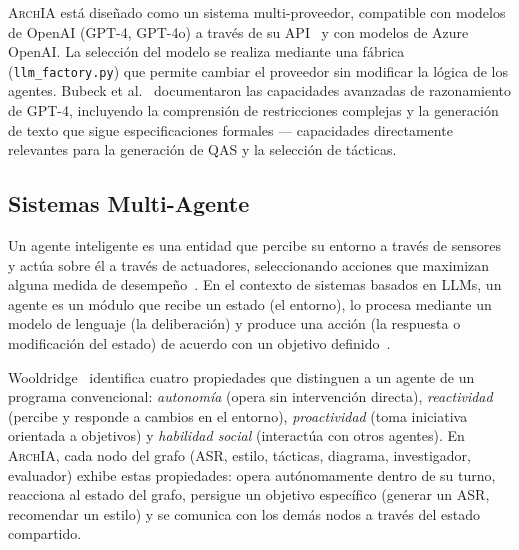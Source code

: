 \documentclass[12pt, letterpaper, oneside]{article}
\newcommand{\archia}{\textsc{ArchIA}}
\begin{document}
\archia{} está diseñado como un sistema multi-proveedor, compatible con modelos
de OpenAI (GPT-4, GPT-4o) a través de su API~\cite{openai2024} y con modelos de
Azure OpenAI. La selección del modelo se realiza mediante una fábrica
(\texttt{llm\_factory.py}) que permite cambiar el proveedor sin modificar la
lógica de los agentes. Bubeck et al.~\cite{bubeck2023sparks} documentaron las
capacidades avanzadas de razonamiento de GPT-4, incluyendo la comprensión de
restricciones complejas y la generación de texto que sigue especificaciones
formales --- capacidades directamente relevantes para la generación de QAS y la
selección de tácticas.


\subsection{Sistemas Multi-Agente}
\label{subsec:multi-agente}


Un agente inteligente es una entidad que percibe su entorno a través de sensores
y actúa sobre él a través de actuadores, seleccionando acciones que maximizan
alguna medida de desempeño~\cite{russell2020artificial}. En el contexto de
sistemas basados en LLMs, un agente es un módulo que recibe un estado (el entorno),
lo procesa mediante un modelo de lenguaje (la deliberación) y produce una acción
(la respuesta o modificación del estado) de acuerdo con un objetivo
definido~\cite{wang2023survey}.

Wooldridge~\cite{wooldridge2009introduction} identifica cuatro propiedades que
distinguen a un agente de un programa convencional: \emph{autonomía} (opera sin
intervención directa), \emph{reactividad} (percibe y responde a cambios en el
entorno), \emph{proactividad} (toma iniciativa orientada a objetivos) y
\emph{habilidad social} (interactúa con otros agentes). En \archia{}, cada nodo
del grafo (ASR, estilo, tácticas, diagrama, investigador, evaluador) exhibe estas
propiedades: opera autónomamente dentro de su turno, reacciona al estado del grafo,
persigue un objetivo específico (generar un ASR, recomendar un estilo) y se
comunica con los demás nodos a través del estado compartido.
\end{document}
